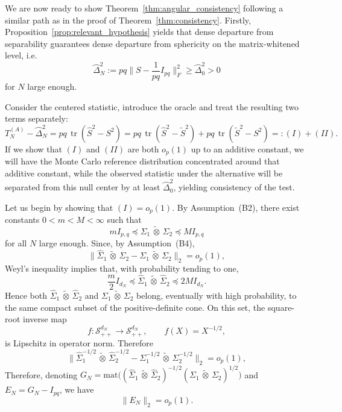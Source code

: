 \documentclass[12pt]{article}
\newcommand{\mat}{\mathrm{mat}}
\newcommand{\tr}{\operatorname{tr}}
\newcommand{\ot}{\,\tilde\otimes\,}
\newcommand{\mmle}{\widehat \Sigma_1 \ot \widehat \Sigma_2}
\begin{document}
We are now ready to show Theorem~\ref{thm:angular_consistency} following a similar path as in the proof of Theorem~\ref{thm:consistency}. Firstly, Proposition~\ref{prop:relevant_hypothesis} yields that dense departure from separability guarantees dense departure from sphericity on the matrix-whitened level, i.e.
\begin{equation}\label{eq:departure}
\wideparen{\Delta}_N^2 := pq \| S - \frac{1}{pq} I_{pq} \|^2_F \geq \wideparen{\Delta}_0^2 > 0
\end{equation}
for $N$ large enough.

Consider the centered statistic, introduce the oracle and treat the resulting two terms separately:
\[
	T_N^{(A)}-\wideparen{\Delta}_N^2
	=
	pq\,\tr(\widehat S^2-S^2)
	=
	pq\,\tr(\widehat S^2-\widetilde S^2)
	+
	pq\,\tr(\widetilde S^2-S^2)
	=: (I)+(II).
\]
If we show that $(I)$ and $(II)$ are both $o_p(1)$ up to an additive constant, we will have the Monte Carlo reference distribution concentrated around that additive constant, while the observed statistic under the alternative will be separated from this null center by at least $\wideparen{\Delta}_0^2$, yielding consistency of the test.

Let us begin by showing that $(I)=o_p(1)$. By Assumption~(B2), there exist constants \(0<m<M<\infty\) such that
\begin{equation}\label{eq:spectral_control}
mI_{p,q}\preceq \Sigma_{1}\ot\Sigma_{2}\preceq M I_{p,q}
\end{equation}
for all $N$ large enough. Since, by Assumption~(B4),
\[
\|\widehat\Sigma_{1}\ot\widehat\Sigma_{2}-\Sigma_{1}\ot\Sigma_{2}\|_{2}=o_p(1),
\]
Weyl's inequality implies that, with probability tending to one,
\[
\frac m2 I_{d_N}\preceq \widehat\Sigma_{1}\ot\widehat\Sigma_{2}\preceq 2M I_{d_N}.
\]
Hence both $\widehat\Sigma_{1}\ot\widehat\Sigma_{2}$ and $\Sigma_{1}\ot\Sigma_{2}$ belong, eventually with high probability, to the same compact subset of the positive-definite cone. On this set, the square-root inverse map
\[
f:\mathcal S_{++}^{d_N}\to \mathcal S_{++}^{d_N},
\qquad
f(X)=X^{-1/2},
\]
is Lipschitz in operator norm. Therefore
\[
\|\widehat\Sigma_{1}^{-1/2}\ot\widehat\Sigma_{2}^{-1/2}-\Sigma_{1}^{-1/2}\ot\Sigma_{2}^{-1/2}\|_{2}=o_p(1),
\]
Therefore, denoting $G_N = \mat\big((\mmle)^{-1/2} (\Sigma_{1}\ot\Sigma_{2})^{1/2}\big)$ and $E_N=G_N - I_{pq}$, we have
\[
\|E_N\|_{2} = 
o_p(1).
\]
\end{document}
